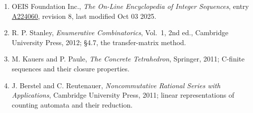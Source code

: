 \documentclass[11pt]{article}
\theoremstyle{definition}
\begin{document}
\begin{enumerate}

\item OEIS Foundation Inc., \emph{The On-Line Encyclopedia of Integer Sequences}, entry \href{https://oeis.org/A224060}{A224060}, revision 8, last modified Oct 03 2025.

\item R. P. Stanley, \emph{Enumerative Combinatorics}, Vol.~1, 2nd ed., Cambridge University Press, 2012; \S4.7, the transfer-matrix method.

\item M. Kauers and P. Paule, \emph{The Concrete Tetrahedron}, Springer, 2011; C-finite sequences and their closure properties.

\item J. Berstel and C. Reutenauer, \emph{Noncommutative Rational Series with Applications}, Cambridge University Press, 2011; linear representations of counting automata and their reduction.

\end{enumerate}
\end{document}
